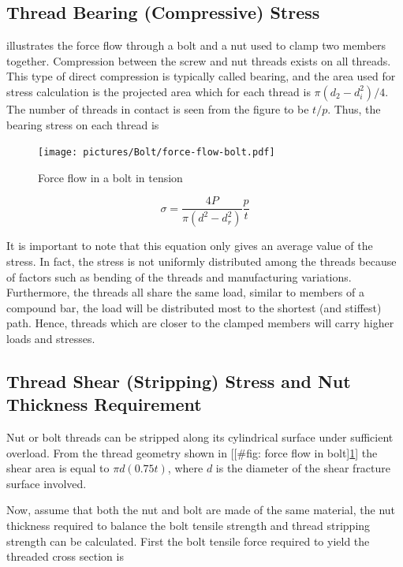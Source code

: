\documentclass[a4paper,openany,12pt]{book}
\begin{document}
{{\subsection{Thread Bearing (Compressive) Stress}
\label{thread-bearing-compressive-stress}
illustrates the force flow through a bolt and a nut used to clamp two
members together. Compression between the screw and nut threads exists
on all threads. This type of direct compression is typically called
bearing, and the area used for stress calculation is the projected area
which for each thread is \(\pi(d_2 - d_i^2) / 4\). The number of threads
in contact is seen from the figure to be \(t/p\). Thus, the bearing stress
on each thread is


\begin{figure}[htbp]
\centering
\texttt{[image: pictures/Bolt/force-flow-bolt.pdf]}
\caption{\label{fig: force flow in bolt}
Force flow in a bolt in tension \cite{juvinall2006fundamentals}}
\end{figure}

$$\sigma  = \frac{4P}{\pi (d^2 - d_r^2)}\frac{p}{t}$$

It is important to note that this equation only gives an average value
of the stress. In fact, the stress is not uniformly distributed among
the threads because of factors such as bending of the threads and
manufacturing variations. Furthermore, the threads all share the same
load, similar to members of a compound bar, the load will be distributed
most to the shortest (and stiffest) path. Hence, threads which are
closer to the clamped members will carry higher loads and stresses.

\subsection{Thread Shear (Stripping) Stress and Nut Thickness Requirement}
\label{thread-shear-stripping-stress-and-nut-thickness-requirement}
Nut or bolt threads can be stripped along its cylindrical surface under
sufficient overload. From the thread geometry shown in
[[\#fig: force flow in bolt]\ref{fig: force flow in bolt}] the shear area
is equal to \(\pi d(0.75t)\), where \(d\) is the diameter of the shear
fracture surface involved.

Now, assume that both the nut and bolt are made of the same material,
the nut thickness required to balance the bolt tensile strength and
thread stripping strength can be calculated. First the bolt tensile
force required to yield the threaded cross section is

}}
\end{document}
